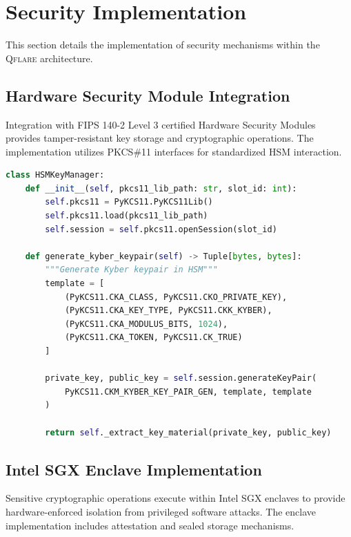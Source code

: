 ﻿\documentclass[12pt,a4paper,twoside]{book}
\newcommand{\qflare}{\textsc{Qflare}}
\begin{document}
\section{Security Implementation}
\label{sec:security-implementation}

This section details the implementation of security mechanisms within the \qflare{} architecture.

\subsection{Hardware Security Module Integration}
\label{subsec:hsm-integration}

Integration with FIPS 140-2 Level 3 certified Hardware Security Modules provides tamper-resistant key storage and cryptographic operations. The implementation utilizes PKCS\#11 interfaces for standardized HSM interaction.

\begin{lstlisting}[language=Python, caption=HSM Key Generation Interface, label=lst:hsm-keygen]
class HSMKeyManager:
    def __init__(self, pkcs11_lib_path: str, slot_id: int):
        self.pkcs11 = PyKCS11.PyKCS11Lib()
        self.pkcs11.load(pkcs11_lib_path)
        self.session = self.pkcs11.openSession(slot_id)
    
    def generate_kyber_keypair(self) -> Tuple[bytes, bytes]:
        """Generate Kyber keypair in HSM"""
        template = [
            (PyKCS11.CKA_CLASS, PyKCS11.CKO_PRIVATE_KEY),
            (PyKCS11.CKA_KEY_TYPE, PyKCS11.CKK_KYBER),
            (PyKCS11.CKA_MODULUS_BITS, 1024),
            (PyKCS11.CKA_TOKEN, PyKCS11.CK_TRUE)
        ]
        
        private_key, public_key = self.session.generateKeyPair(
            PyKCS11.CKM_KYBER_KEY_PAIR_GEN, template, template
        )
        
        return self._extract_key_material(private_key, public_key)
\end{lstlisting}

\subsection{Intel SGX Enclave Implementation}
\label{subsec:sgx-implementation}

Sensitive cryptographic operations execute within Intel SGX enclaves to provide hardware-enforced isolation from privileged software attacks. The enclave implementation includes attestation and sealed storage mechanisms.
\end{document}
